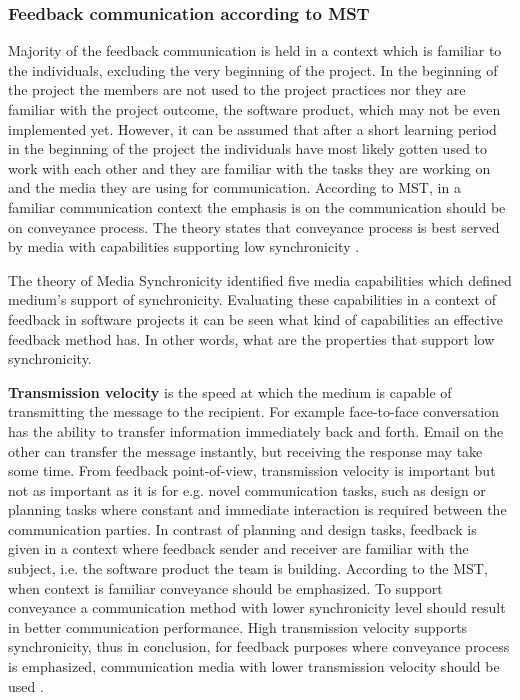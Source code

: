 \documentclass[english,12pt,a4paper,pdftex]{article}
\begin{document}
\subsubsection{Feedback communication according to MST}

Majority of the feedback communication is held in a context which is familiar to the individuals, excluding the very beginning of the project. In the beginning of the project the members are not used to the project practices nor they are familiar with the project outcome, the software product, which may not be even implemented yet. However, it can be assumed that after a short learning period in the beginning of the project the individuals have most likely gotten used to work with each other and they are familiar with the tasks they are working on and the media they are using for communication. According to \ac{MST}, in a familiar communication context the emphasis is on the communication should be on conveyance process. The theory states that conveyance process is best served by media with capabilities supporting low synchronicity \citep{dennis1999} \citep{dennis2008}.

The theory of Media Synchronicity identified five media capabilities which defined medium's support of synchronicity. Evaluating these capabilities in a context of feedback in software projects it can be seen what kind of capabilities an effective feedback method has. In other words, what are the properties that support low synchronicity.

\textbf{Transmission velocity} is the speed at which the medium is capable of transmitting the message to the recipient. For example face-to-face conversation has the ability to transfer information immediately back and forth. Email on the other can transfer the message instantly, but receiving the response may take some time. From feedback point-of-view, transmission velocity is important but not as important as it is for e.g. novel communication tasks, such as design or planning tasks where constant and immediate interaction is required between the communication parties. In contrast of planning and design tasks, feedback is given in a context where feedback sender and receiver are familiar with the subject, i.e. the software product the team is building. According to the \ac{MST}, when context is familiar conveyance should be emphasized. To support conveyance a communication method with lower synchronicity level should result in better communication performance. High transmission velocity supports synchronicity, thus in conclusion, for feedback purposes where conveyance process is emphasized, communication media with lower transmission velocity should be used \citep{dennis1999}.
\end{document}
